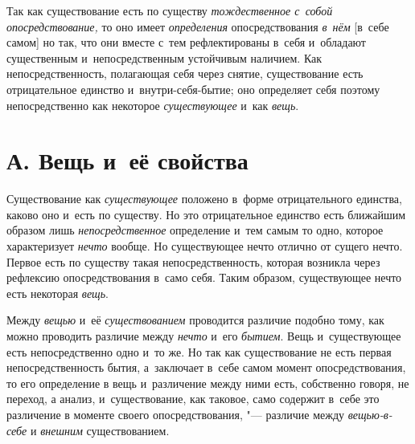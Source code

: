 Так как существование есть по существу
{\em тождественное с~собой опосредствование,} то оно
имеет {\em определения} опосредствования
{\em в~нём} [в~себе самом] но так, что они вместе с~тем
рефлектированы в~себя и~обладают существенным и~непосредственным устойчивым
наличием. Как непосредственность, полагающая себя через снятие,
существование есть отрицательное единство и~внутри-себя-бытие; оно
определяет себя поэтому непосредственно как некоторое
{\em существующее} и~как
{\em вещь}.


\section[А. Вещь и~её свойства]{А. Вещь и~её свойства}

Существование как {\em существующее} положено в~форме отрицательного
единства, каково оно и~есть по существу. Но это отрицательное единство есть
ближайшим образом лишь {\em непосредственное}
определение и~тем самым то одно, которое характеризует
{\em нечто} вообще. Но существующее нечто отлично от
сущего нечто. Первое есть по существу такая непосредственность, которая
возникла через рефлексию опосредствования в~само себя. Таким образом,
существующее нечто есть некоторая {\em вещь}.

Между {\em вещью} и~её
{\em существованием} проводится различие подобно тому,
как можно проводить различие между {\em нечто} и~его
{\em бытием}. Вещь и~существующее есть непосредственно
одно и~то же. Но так как существование не есть первая непосредственность
бытия, а~заключает в~себе самом момент опосредствования, то его определение
в вещь и~различение между ними есть, собственно говоря, не переход, а
анализ, и~существование, как таковое, само содержит в~себе это различение в
моменте своего опосредствования, "--- различие между
{\em вещью-в-себе} и {\em внешним} существованием.



